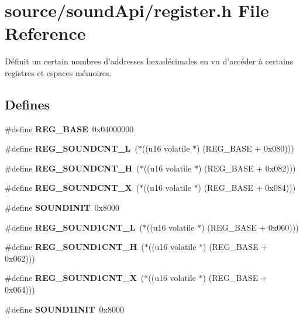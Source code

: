 \section{source/soundApi/register.h File Reference}
\label{register_8h}


Définit un certain nombres d'addresses hexadécimales en vu d'accéder à certains registres et espaces mémoires.  


\subsection*{Defines}
\begin{DoxyCompactItemize}
\item 
\#define {\bfseries REG\_\-BASE}~0x04000000\label{register_8h_af668d1af32807bb8ffb17c0ed32a1697}

\item 
\#define {\bfseries REG\_\-SOUNDCNT\_\-L}~($\ast$((u16 volatile $\ast$) (REG\_\-BASE + 0x080)))\label{register_8h_a446f761db6250798e671e893b084916e}

\item 
\#define {\bfseries REG\_\-SOUNDCNT\_\-H}~($\ast$((u16 volatile $\ast$) (REG\_\-BASE + 0x082)))\label{register_8h_ad527b5102122fd008452f79706e6482b}

\item 
\#define {\bfseries REG\_\-SOUNDCNT\_\-X}~($\ast$((u16 volatile $\ast$) (REG\_\-BASE + 0x084)))\label{register_8h_a1e513b6dfb04b5855f9cf4d1db3a0fcc}

\item 
\#define {\bfseries SOUNDINIT}~0x8000\label{register_8h_ae62e75c097c2115b328128f5113d2434}

\item 
\#define {\bfseries REG\_\-SOUND1CNT\_\-L}~($\ast$((u16 volatile $\ast$) (REG\_\-BASE + 0x060)))\label{register_8h_ad7befcb9c0c47425ab484b61c2f6e18b}

\item 
\#define {\bfseries REG\_\-SOUND1CNT\_\-H}~($\ast$((u16 volatile $\ast$) (REG\_\-BASE + 0x062)))\label{register_8h_a134c65fe394493ea74885a1dd3a02a82}

\item 
\#define {\bfseries REG\_\-SOUND1CNT\_\-X}~($\ast$((u16 volatile $\ast$) (REG\_\-BASE + 0x064)))\label{register_8h_ad42362836ba7747cab3a6b7ed276c163}

\item 
\#define {\bfseries SOUND1INIT}~0x8000\label{register_8h_aa3e1528a7a60d33e2fa188d38be45e14}


\end{DoxyCompactItemize}
